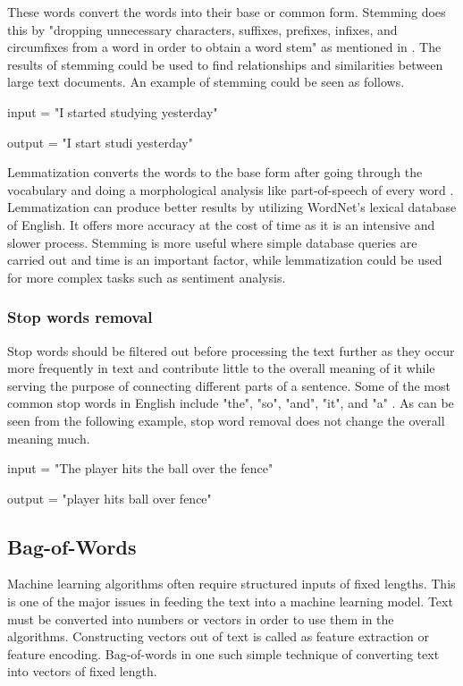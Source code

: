 	These words convert the words into their base or common form. Stemming does this by "dropping unnecessary characters, suffixes, prefixes, infixes, and circumfixes from a word in order to obtain a word stem" as mentioned in \cite{kdnuggets_preprocessing}. The results of stemming could be used to find relationships and similarities between large text documents. An example of stemming could be seen as follows.
	
	\vspace{2mm}
	
	input = "I started studying yesterday"
	
	output = "I start studi yesterday"
	
	Lemmatization converts the words to the base form after going through the vocabulary and doing a morphological analysis like part-of-speech of every word \cite{jurafsky2014speech}. Lemmatization can produce better results by utilizing WordNet's lexical database of English. It offers more accuracy at the cost of time as it is an intensive and slower process. Stemming is more useful where simple database queries are carried out and time is an important factor, while lemmatization could be used for more complex tasks such as sentiment analysis.
	
	\subsubsection{Stop words removal} 
	
	Stop words should be filtered out before processing the text further as they occur more frequently in text and contribute little to the overall meaning of it while serving the purpose of connecting different parts of a sentence. Some of the most common stop words in English include "the", "so", "and", "it", and "a" \cite{nltk_list}. As can be seen from the following example, stop word removal does not change the overall meaning much. 
	
	\vspace{2mm}
	
	input = "The player hits the ball over the fence"
	
	output = "player hits ball over fence"
	
	\subsection{Bag-of-Words}
	
	Machine learning algorithms often require structured inputs of fixed lengths. This is one of the major issues in feeding the text into a machine learning model. Text must be converted into numbers or vectors in order to use them in the algorithms. Constructing vectors out of text is called as feature extraction or feature encoding. Bag-of-words in one such simple technique of converting text into vectors of fixed length.
	
